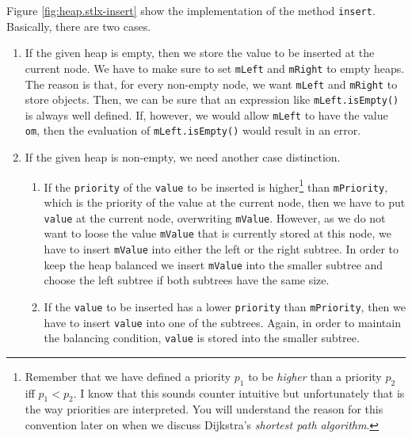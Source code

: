 \noindent
Figure \ref{fig:heap.stlx-insert} show the implementation of the method \texttt{insert}.
Basically, there are two cases.
\begin{enumerate}
\item If the given heap is empty, then we store the value to be inserted at the current node.
      We have to make sure to set \texttt{mLeft} and \texttt{mRight} to empty heaps.  The reason is
      that, for every non-empty node, we want \texttt{mLeft} and \texttt{mRight} to store objects.
      Then, we can be sure that an expression like \texttt{mLeft.isEmpty()} is always well defined.
      If, however, we would allow \texttt{mLeft} to have the value \texttt{om}, then the evaluation
      of \texttt{mLeft.isEmpty()} would result in an error.
\item If the given heap is non-empty, we need another case distinction.
  \begin{enumerate}
  \item If the \texttt{priority} of the \texttt{value} to be inserted is higher\footnote{
        Remember that we have defined a priority $p_1$ to be \emph{higher} than a priority $p_2$
        iff $p_1 < p_2$.  I know that this sounds counter intuitive but unfortunately that is the
        way priorities are interpreted.  You will understand the reason for this convention later on
        when we discuss Dijkstra's \emph{shortest path algorithm}.}
        than
        \texttt{mPriority}, which is the priority of the value at the current node, then we have to 
        put \texttt{value} at the current node, overwriting \texttt{mValue}.  However, as we do not want
        to loose the value \texttt{mValue} that is currently stored at this node, we have to insert 
        \texttt{mValue} into either the left or the right subtree.  In order to keep the heap
        balanced we insert \texttt{mValue} into the smaller subtree and choose the left subtree if
        both subtrees have the same size.
  \item If the \texttt{value} to be inserted has a lower \texttt{priority} than \texttt{mPriority}, then we have
        to insert \texttt{value} into one of the subtrees.  Again, in order to maintain the balancing
        condition, \texttt{value} is stored into the smaller subtree.
  \end{enumerate}
\end{enumerate}

